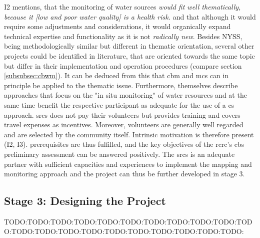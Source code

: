 I2 mentions, that the monitoring of water sources \textit{would fit well thematically, because it [low and poor water quality] is a health risk.} and that although it would require some adjustments and considerations, it would organically expand technical expertise and functionality as it is not \textit{radically new}. Besides NYSS, being methodologically similar but different in thematic orientation, several other projects could be identified in literature, that are oriented towards the same topic but differ in their implementation and operation procedures (compare section \ref*{subsubsec:cbwm}). It can be deduced from this that \acrshort{cbm} and \acrshort{mcs} can in principle be applied to the thematic issue. Furthermore, \autocite{fraislCitizenScienceEnvironmental2022} themselves describe approaches that focus on the "in situ monitoring" of water resources and at the same time benefit the respective participant as adequate for the use of a \acrlong{cs} approach. \acrshort{srcs} does not pay their volunteers but provides training and covers travel expenses as incentives. Moreover, volunteers are generally well regarded and are selected by the community itself. Intrinsic motivation is therefore present (I2, I3).\newline
\autocite{fraislCitizenScienceEnvironmental2022} prerequisites are thus fulfilled, and the key objectives of the \acrshort{rcrc}'s \acrshort{cbs} preliminary assessment can be answered positively. The \acrshort{srcs} is an adequate partner with sufficient capacities and experiences to implement the mapping and monitoring approach and the project can thus be further developed in stage 3. 

\subsection{Stage 3: Designing the Project}\label{subsec:stage3_appl}
TODO:TODO:TODO:TODO:TODO:TODO:TODO:TODO:TODO:TODO:TODO:TODO:TODO:TODO:TODO:TODO:TODO:TODO:TODO:TODO:TODO:

